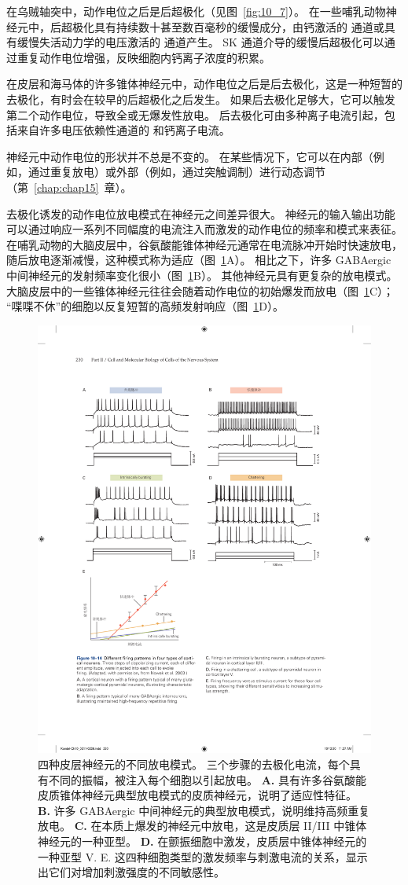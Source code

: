 在乌贼轴突中，动作电位之后是后超极化（见图~\ref{fig:10_7}）。 
在一些哺乳动物神经元中，后超极化具有持续数十甚至数百毫秒的缓慢成分，由钙激活的  通道或具有缓慢失活动力学的电压激活的  通道产生。
SK 通道介导的缓慢后超极化可以通过重复动作电位增强，反映细胞内钙离子浓度的积累。


在皮层和海马体的许多锥体神经元中，动作电位之后是后去极化，这是一种短暂的去极化，有时会在较早的后超极化之后发生。
如果后去极化足够大，它可以触发第二个动作电位，导致全或无爆发性放电。
后去极化可由多种离子电流引起，包括来自许多电压依赖性通道的  和钙离子电流。


神经元中动作电位的形状并不总是不变的。
在某些情况下，它可以在内部（例如，通过重复放电）或外部（例如，通过突触调制）进行动态调节（第~\ref{chap:chap15}~章）。


去极化诱发的动作电位放电模式在神经元之间差异很大。 神经元的输入输出功能可以通过响应一系列不同幅度的电流注入而激发的动作电位的频率和模式来表征。
在哺乳动物的大脑皮层中，谷氨酸能锥体神经元通常在电流脉冲开始时快速放电，随后放电逐渐减慢，这种模式称为适应（图~\ref{fig:10_14}A）。
相比之下，许多 GABAergic 中间神经元的发射频率变化很小（图~\ref{fig:10_14}B）。
其他神经元具有更复杂的放电模式。
大脑皮层中的一些锥体神经元往往会随着动作电位的初始爆发而放电（图~\ref{fig:10_14}C）； “喋喋不休”的细胞以反复短暂的高频发射响应（图~\ref{fig:10_14}D）。


\begin{figure}[htbp]
	\centering
	\includegraphics[width=0.75\linewidth]{chap10/fig_10_14}
	\caption{四种皮层神经元的不同放电模式。 三个步骤的去极化电流，每个具有不同的振幅，被注入每个细胞以引起放电\cite{nowak2003electrophysiological}。
		\textbf{A.} 具有许多谷氨酸能皮质锥体神经元典型放电模式的皮质神经元，说明了适应性特征。
		\textbf{B.} 许多 GABAergic 中间神经元的典型放电模式，说明维持高频重复放电。
		\textbf{C.} 在本质上爆发的神经元中放电，这是皮质层 II/III 中锥体神经元的一种亚型。
		\textbf{D.} 在颤振细胞中激发，皮质层中锥体神经元的一种亚型 V. E. 这四种细胞类型的激发频率与刺激电流的关系，显示出它们对增加刺激强度的不同敏感性。}
	\label{fig:10_14}
\end{figure}


